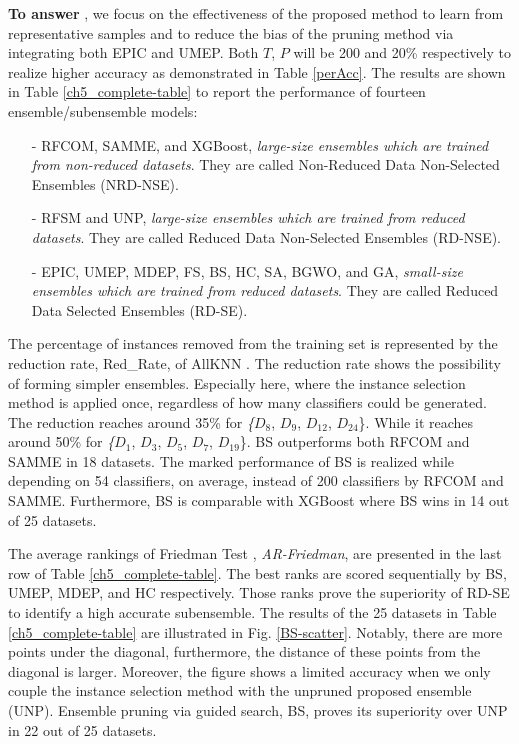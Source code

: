 \textbf{To answer} , we focus on the effectiveness of the proposed method to learn from representative samples and to reduce the bias of the pruning method via integrating both EPIC and UMEP. Both $T$, $P$ will be 200 and 20\% respectively to realize higher accuracy as demonstrated in Table \ref{perAcc}. The results are shown in Table \ref{ch5_complete-table} to report the performance of fourteen ensemble/subensemble models:  
\begin{itemize}[nosep]
    \item[-] RFCOM, SAMME, and XGBoost, \textit{ large-size ensembles which are trained from non-reduced datasets}. They are called Non-Reduced Data Non-Selected Ensembles (NRD-NSE).
    \item[-] RFSM and UNP, \textit{ large-size ensembles which are trained from reduced datasets}. They are called Reduced Data Non-Selected Ensembles (RD-NSE).
    \item[-] EPIC, UMEP, MDEP, FS, BS, HC, SA, BGWO, and GA, \textit{ small-size ensembles which are trained from reduced datasets}. They are called Reduced Data Selected Ensembles (RD-SE).
\end{itemize}


The percentage of instances removed from the training set is represented by the reduction rate, Red\_Rate, of AllKNN \cite{tomek1976}. The reduction rate shows the possibility of forming simpler ensembles. Especially here, where the instance selection method is applied once, regardless of how many classifiers could be generated. The reduction reaches around 35\% for \textit\{$D_{8}$, $D_{9}$, $D_{12}$, $D_{24}$\}. While it reaches around 50\% for \textit\{$D_{1}$, $D_{3}$, $D_{5}$, $D_{7}$, $D_{19}$\}. BS outperforms both RFCOM and SAMME in 18 datasets. The marked performance of BS is realized while depending on 54 classifiers, on average, instead of 200 classifiers by RFCOM and SAMME. Furthermore, BS is comparable with XGBoost where BS wins in 14 out of 25 datasets. 

The average rankings of Friedman Test \cite{demsar2006}, \textit{AR-Friedman}, are presented in the last row of Table \ref{ch5_complete-table}. The best ranks are scored sequentially by BS, UMEP, MDEP, and HC respectively. Those ranks prove the superiority of RD-SE to identify a high accurate subensemble. The results of the 25 datasets in Table \ref{ch5_complete-table} are illustrated in Fig. \ref{BS-scatter}. Notably, there are more points under the diagonal, furthermore, the distance of these points from the diagonal is larger. Moreover, the figure shows a limited accuracy when we only couple the instance selection method with the unpruned proposed ensemble (UNP). Ensemble pruning via guided search, BS, proves its superiority over UNP in 22 out of 25 datasets.    


